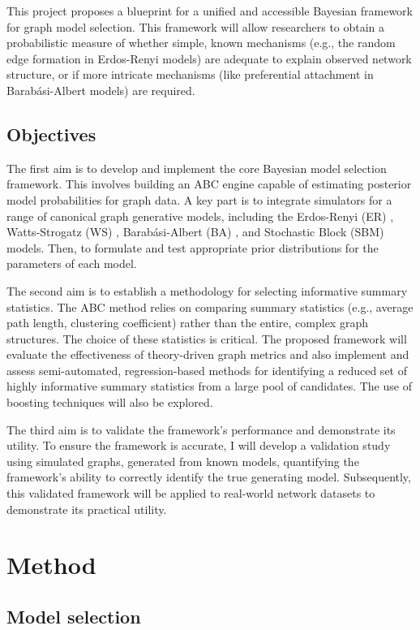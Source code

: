 \documentclass[stu,12pt,floatsintext]{apa7}
\begin{document}
This project proposes a blueprint for a unified and accessible Bayesian framework for graph model selection. This framework will allow researchers to obtain a probabilistic measure of whether simple, known mechanisms (e.g., the random edge formation in Erdos-Renyi models) are adequate to explain observed network structure, or if more intricate mechanisms (like preferential attachment in Barabási-Albert models) are required.

\subsection{Objectives}

The first aim is to develop and implement the core Bayesian model selection framework. This involves building an ABC engine capable of estimating posterior model probabilities for graph data. A key part is to integrate simulators for a range of canonical graph generative models, including the Erdos-Renyi (ER) , Watts-Strogatz (WS) , Barabási-Albert (BA) , and Stochastic Block (SBM) models. Then, to formulate and test appropriate prior distributions for the parameters of each model.

The second aim is to establish a methodology for selecting informative summary statistics. The ABC method relies on comparing summary statistics (e.g., average path length, clustering coefficient) rather than the entire, complex graph structures. The choice of these statistics is critical. The proposed framework will evaluate the effectiveness of theory-driven graph metrics and also implement and assess semi-automated, regression-based methods for identifying a reduced set of highly informative summary statistics from a large pool of candidates. The use of boosting techniques will also be explored.

The third aim is to validate the framework's performance and demonstrate its utility. To ensure the framework is accurate, I will develop a validation study using simulated graphs, generated from known models, quantifying the framework's ability to correctly identify the true generating model. Subsequently, this validated framework will be applied to real-world network datasets to demonstrate its practical utility.


\section{Method}

\subsection{Model selection}
\end{document}
